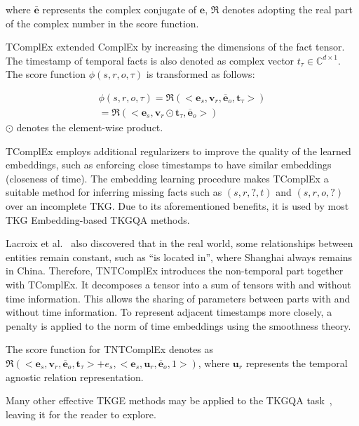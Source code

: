 where $\bar{\boldsymbol{e}}$ represents the complex conjugate of $\boldsymbol{e}$, $\mathfrak{R}$ denotes adopting the real part of the complex number in the score function.


TComplEx extended ComplEx by increasing the dimensions of the fact tensor. The timestamp of temporal facts is also denoted as complex vector $t_\tau \in \mathbb{C}^{d\times1}$. The score function  $\phi(s, r, o, \tau)$ is transformed as follows:

$$
\begin{array}{r}
\phi(s, r, o, \tau)=\mathfrak{R}\left(<\boldsymbol{e}_s, \boldsymbol{v}_r, \overline{\boldsymbol{e}}_o, \boldsymbol{t}_\tau>\right) \\
=\mathfrak{R}\left(<\boldsymbol{e}_s, \boldsymbol{v}_r \odot \boldsymbol{t}_\tau, \overline{\boldsymbol{e}}_o>\right)
\end{array}
$$
$\odot$ denotes the element-wise product.  

TComplEx employs additional regularizers to improve the quality of the learned embeddings, such as enforcing close timestamps to have similar embeddings (closeness of time). The embedding learning procedure makes TComplEx a suitable method for inferring missing facts such as $(s, r, ?, t)$ and $(s, r, o, ?)$ over an incomplete TKG. Due to its aforementioned benefits, it is used by most TKG Embedding-based TKGQA methods.


Lacroix et al.~\cite{lacroixTensorDecompositionsTemporal2020} also discovered that in the real world, some relationships between entities remain constant, such as ``is located in'', where Shanghai always remains in China. Therefore, TNTComplEx introduces the non-temporal part together with TComplEx. It decomposes a tensor into a sum of tensors with and without time information. This allows the sharing of parameters between parts with and without time information. To represent adjacent timestamps more closely, a penalty is applied to the norm of time embeddings using the smoothness theory.

The score function for TNTComplEx denotes as $\mathfrak{R}\left(<\boldsymbol{e}_s, \boldsymbol{v}_r, \overline{\boldsymbol{e}}_o, \boldsymbol{t}_\tau> + e_s, <\boldsymbol{e}_s, \boldsymbol{u}_r, \overline{\boldsymbol{e}}_o, 1>\right)$, where $ \boldsymbol{u}_r$ represents the temporal agnostic relation representation.

Many other effective TKGE methods may be applied to the TKGQA task~\cite{liuTLogicTemporalLogical2022a,yuanTRHyTETemporalKnowledge2022, xiaMetaTKGLearningEvolutionary2023}, leaving it for the reader to explore.

